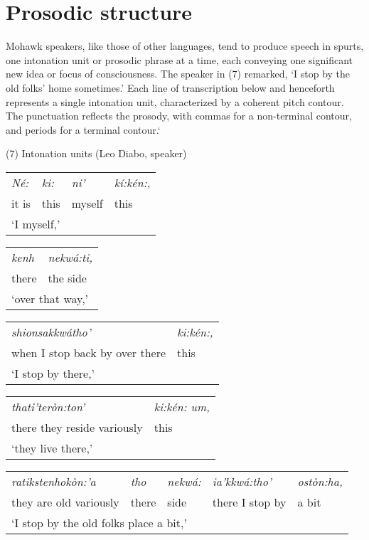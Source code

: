 \documentclass[output=paper,colorlinks,citecolor=brown
]{langscibook}
\begin{document}
\section{Prosodic structure}

Mohawk speakers, like those of other languages, tend to produce speech in spurts, one intonation unit or prosodic phrase at a time, each conveying one significant new idea or focus of consciousness. The speaker in (7) remarked, `I stop by the old folks' home sometimes.' Each line of transcription below and henceforth represents a single intonation unit, characterized by a coherent pitch contour. The punctuation reflects the prosody, with commas for a non-terminal contour, and periods for a terminal contour.\bigskip`

(7) Intonation units (Leo Diabo, speaker)\\

\begin{tabular}{llll}
\emph{Né:} & \emph{ki:} & \emph{ni'} & \emph{kí:kén:,}\\
it is & this & myself &this\\
\multicolumn{4}{l}{`I myself,'}

\end{tabular}\bigskip

\begin{tabular}{ll}
\emph{kenh} & \emph{nekwá:ti,}\\
there & the side\\
\multicolumn{2}{l}{`over that way,'}
\end{tabular}\bigskip

\begin{tabular}{ll}
\emph{shionsakkwátho'} & \emph{ki:kén:,}\\
when I stop back by over there & this\\
\multicolumn{2}{l}{`I stop by there,'}
\end{tabular}\bigskip


\begin{tabular}{ll}
\emph{thati'teròn:ton'} & \emph{ki:kén: um,}\\

there they reside variously & this\\
\multicolumn{2}{l}{`they live there,'}
\end{tabular}\bigskip

\begin{tabular}{lllll}
\emph{ratikstenhokòn:'a} & \emph{tho} & \emph{nekwá:} &\emph{ia'kkwá:tho'} & \emph{ostòn:ha,}\\

they are old variously & there & side & there I stop by & a bit\\
\multicolumn{5}{l}{`I stop by the old folks place a bit,'}
\end{tabular}\bigskip
\end{document}
